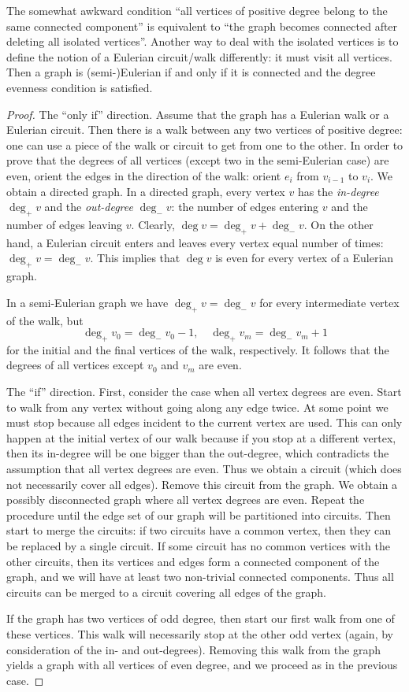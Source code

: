 The somewhat awkward condition ``all vertices of positive degree belong to the same connected component''
is equivalent to ``the graph becomes connected after deleting all isolated vertices''.
Another way to deal with the isolated vertices is to define the notion of a Eulerian circuit/walk differently:
it must visit all vertices.
Then a graph is (semi-)Eulerian if and only if it is connected and the degree evenness condition is satisfied.
\begin{proof}
The ``only if'' direction. Assume that the graph has a Eulerian walk or a Eulerian circuit.
Then there is a walk between any two vertices of positive degree:
one can use a piece of the walk or circuit to get from one to the other.
In order to prove that the degrees of all vertices (except two in the semi-Eulerian case) are even,
orient the edges in the direction of the walk: orient $e_i$ from $v_{i-1}$ to $v_i$.
We obtain a directed graph.
In a directed graph, every vertex $v$ has the \emph{in-degree} $\deg_+ v$ and the \emph{out-degree} $\deg_- v$:
the number of edges entering $v$ and the number of edges leaving $v$.
Clearly, $\deg v = \deg_+ v + \deg_- v$.
On the other hand, a Eulerian circuit enters and leaves every vertex equal number of times: $\deg_+ v = \deg_- v$.
This implies that $\deg v$ is even for every vertex of a Eulerian graph.

In a semi-Eulerian graph we have $\deg_+ v = \deg_- v$ for every intermediate vertex of the walk, but
\[
\deg_+ v_0 = \deg_- v_0 - 1, \quad \deg_+ v_m = \deg_- v_m + 1
\]
for the initial and the final vertices of the walk, respectively.
It follows that the degrees of all vertices except $v_0$ and $v_m$ are even.

The ``if'' direction.
First, consider the case when all vertex degrees are even.
Start to walk from any vertex without going along any edge twice.
At some point we must stop because all edges incident to the current vertex are used.
This can only happen at the initial vertex of our walk because if you stop at a different vertex, then its in-degree will be one bigger than the out-degree,
which contradicts the assumption that all vertex degrees are even.
Thus we obtain a circuit (which does not necessarily cover all edges).
Remove this circuit from the graph.
We obtain a possibly disconnected graph where all vertex degrees are even.
Repeat the procedure until the edge set of our graph will be partitioned into circuits.
Then start to merge the circuits: if two circuits have a common vertex, then they can be replaced by a single circuit.
If some circuit has no common vertices with the other circuits,
then its vertices and edges form a connected component of the graph,
and we will have at least two non-trivial connected components.
Thus all circuits can be merged to a circuit covering all edges of the graph.

If the graph has two vertices of odd degree, then start our first walk from one of these vertices.
This walk will necessarily stop at the other odd vertex (again, by consideration of the in- and out-degrees).
Removing this walk from the graph yields a graph with all vertices of even degree, and we proceed as in the previous case.
\end{proof}


